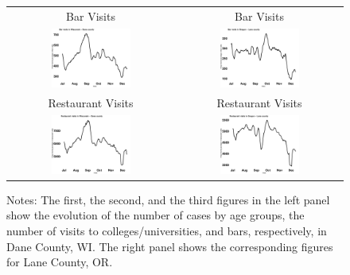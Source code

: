 \documentclass[9pt,twoside,lineno]{pnas-new}
\theoremstyle{definition}
\begin{document}
\begin{figure}[!ht]
{\begin{minipage}{\linewidth}
\begin{tabular}{c|c}
  Bar Visits  &  Bar Visits   \\
      \includegraphics[width=0.50\textwidth,height=0.2\textwidth]{tables_and_figures/barWisconsinDane}&
      \includegraphics[width=0.50\textwidth,height=0.2\textwidth]{tables_and_figures/barOregonLane}\\
   Restaurant Visits  &  Restaurant Visits   \\
      \includegraphics[width=0.50\textwidth,height=0.2\textwidth]{tables_and_figures/restaurantWisconsinDane}&
      \includegraphics[width=0.50\textwidth,height=0.2\textwidth]{tables_and_figures/restaurantOregonLane}\\
    \end{tabular}
  \end{minipage}}
\vspace{-0.2cm}  {\scriptsize
\begin{flushleft}
Notes:  The first, the second, and the third figures in the left panel show the evolution of the number of cases by age groups, the number of visits to colleges/universities, and bars, respectively, in Dane County, WI. The right panel shows the corresponding figures for Lane County, OR.
 \end{flushleft}    }
 \end{figure}
\end{document}
